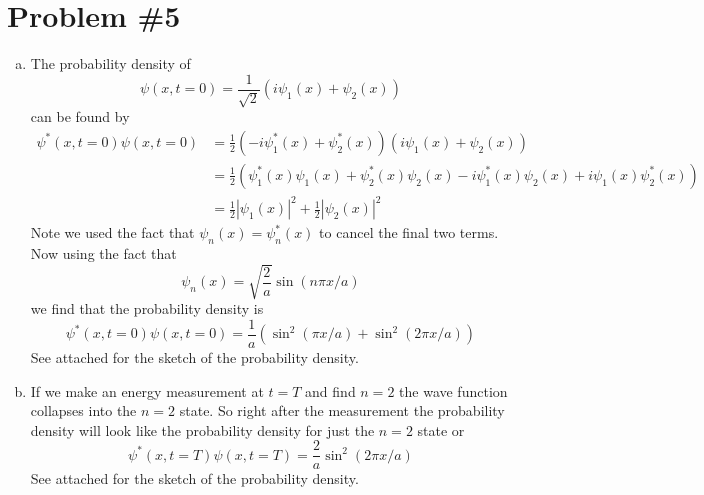 \documentclass[11pt]{article}
\numberwithin{equation}{section}
\begin{document}
\section{Problem \#5}
\begin{enumerate}[(a)]
\item
The probability density of 
$$\psi(x,t=0) = \frac{1}{\sqrt{2}}\left(i\psi_1(x)+\psi_2(x)\right)$$
can be found by 
\begin{align*}
\psi^*(x,t=0)\psi(x,t=0) &= \frac{1}{2}\left(-i\psi^*_1(x)+\psi^*_2(x)\right)\left(i\psi_1(x)+\psi_2(x)\right)\\
&= \frac{1}{2}\left(\psi^*_1(x)\psi_1(x)+\psi^*_2(x)\psi_2(x)-i\psi^*_1(x)\psi_2(x) + i\psi_1(x)\psi^*_2(x)\right)\\
&= \frac{1}{2}|\psi_1(x)|^2+ \frac{1}{2}|\psi_2(x)|^2
\end{align*}
Note we used the fact that $\psi_n(x) = \psi^*_n(x)$ to cancel the final two terms. Now using the fact that
$$\psi_n(x) = \sqrt{\frac{2}{a}}\sin(n\pi x/a)$$
we find that the probability density is
$$\psi^*(x,t=0)\psi(x,t=0) = \frac{1}{a}\left(\sin^2(\pi x/a)+\sin^2(2\pi x/a)\right)$$
See attached for the sketch of the probability density.


\item
If we make an energy measurement at $t=T$ and find $n=2$ the wave function collapses into the $n=2$ state. So right after the measurement the probability density will look like the probability density for just the $n=2$ state or
$$\psi^*(x,t=T)\psi(x,t=T) = \frac{2}{a}\sin^2(2\pi x/a)$$
See attached for the sketch of the probability density.
\end{enumerate}
\end{document}
